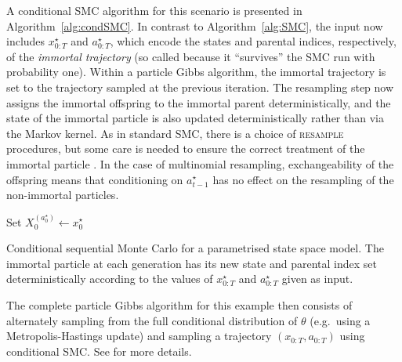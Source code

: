 A conditional SMC algorithm for this scenario is presented in Algorithm~\ref{alg:condSMC}.
In contrast to Algorithm~\ref{alg:SMC}, the input now includes $x_{0:T}^\star$ and $a_{0:T}^\star$, which encode the states and parental indices, respectively, of the \emph{immortal trajectory} (so called because it ``survives'' the SMC run with probability one). Within a particle Gibbs algorithm, the immortal trajectory is set to the trajectory sampled at the previous iteration.
The resampling step now assigns the immortal offspring to the immortal parent deterministically, and the state of the immortal particle is also updated deterministically rather than via the Markov kernel.
As in standard SMC, there is a choice of \textsc{resample} procedures, but some care is needed to ensure the correct treatment of the immortal particle \parencite[for details see e.g.][]{lee2019}.
In the case of multinomial resampling, exchangeability of the offspring means that conditioning on $a_{t-1}^\star$ has no effect on the resampling of the non-immortal particles.

\begin{algorithm}[ht]
\vspace*{10pt}
\DontPrintSemicolon
{}
Set $X_0^{(a_0^\star)} \gets x_0^\star$\;
\vspace*{10pt}
\caption[Conditional sequential Monte Carlo]{Conditional sequential Monte Carlo for a parametrised state space model. The immortal particle at each generation has its new state and parental index set deterministically according to the values of $x_{0:T}^\star$ and $a_{0:T}^\star$ given as input.}
\label{alg:condSMC}
\end{algorithm}
The complete particle Gibbs algorithm for this example then consists of alternately sampling from the full conditional distribution of $\theta$ (e.g.\ using a Metropolis-Hastings update) and sampling a trajectory $(x_{0:T}, a_{0:T})$ using conditional SMC. See \textcite[Section 2.4.3]{andrieu2010} for more details.




